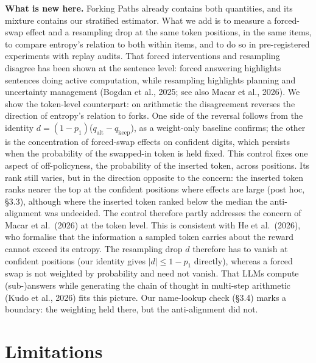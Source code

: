 \documentclass[
  10pt,
  a4paper,
]{article}
\begin{document}
\textbf{What is new here.} Forking Paths already contains both quantities, and its mixture contains our stratified estimator. What we add is to measure a forced-swap effect and a resampling drop at
the same token positions, in the same items, to compare entropy's relation to both within items, and to do so in pre-registered experiments with replay audits. That forced interventions and resampling
disagree has been shown at the sentence level: forced answering highlights sentences doing active computation, while resampling highlights planning and uncertainty management (Bogdan et al., 2025; see
also Macar et al., 2026). We show the token-level counterpart: on arithmetic the disagreement reverses the direction of entropy's relation to forks. One side of the reversal follows from the identity
\(d = (1-p_1)\)(\(q_{\mathrm{alt}} - q_{\mathrm{keep}}\)), as a weight-only baseline confirms; the other is the concentration of forced-swap effects on confident digits, which persists when the
probability of the swapped-in token is held fixed. This control fixes one aspect of off-policyness, the probability of the inserted token, across positions. Its rank still varies, but in the direction
opposite to the concern: the inserted token ranks nearer the top at the confident positions where effects are large (post hoc, §3.3), although where the inserted token ranked below the median the
anti-alignment was undecided. The control therefore partly addresses the concern of Macar et al.~(2026) at the token level. This is consistent with He et al.~(2026), who formalise that the information
a sampled token carries about the reward cannot exceed its entropy. The resampling drop \(d\) therefore has to vanish at confident positions (our identity gives \(|d| \le 1-p_1\) directly), whereas a
forced swap is not weighted by probability and need not vanish. That LLMs compute (sub-)answers while generating the chain of thought in multi-step arithmetic (Kudo et al., 2026) fits this picture.
Our name-lookup check (§3.4) marks a boundary: the weighting held there, but the anti-alignment did not.

\hypertarget{limitations}{%
\section{Limitations}\label{limitations}}
\end{document}
